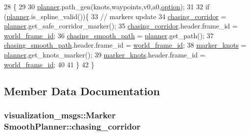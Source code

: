 \begin{DoxyCode}
28                                                                                      \{
29 
30     \hyperlink{class_smooth_planner_aa9df69d4f514c7338ab2d066d38dd1a2}{planner}.path\_gen(knots,waypoints,v0,a0,\hyperlink{class_smooth_planner_af0c954aea3c6b5b82a160ed4be93fb17}{option});
31     
32     \textcolor{keywordflow}{if} (\hyperlink{class_smooth_planner_aa9df69d4f514c7338ab2d066d38dd1a2}{planner}.is\_spline\_valid())\{
33         \textcolor{comment}{// markers update }
34         \hyperlink{class_smooth_planner_addf7aab458c1407f23e3544bd76ac82b}{chasing\_corridor} = \hyperlink{class_smooth_planner_aa9df69d4f514c7338ab2d066d38dd1a2}{planner}.get\_safe\_corridor\_marker();
35         \hyperlink{class_smooth_planner_addf7aab458c1407f23e3544bd76ac82b}{chasing\_corridor}.header.frame\_id = \hyperlink{class_smooth_planner_ade278c4209b962d8342a2ee30e718c8b}{world\_frame\_id};
36         \hyperlink{class_smooth_planner_a6a33038c6041ff972bea7765780b56d0}{chasing\_smooth\_path} = \hyperlink{class_smooth_planner_aa9df69d4f514c7338ab2d066d38dd1a2}{planner}.get\_path();
37         \hyperlink{class_smooth_planner_a6a33038c6041ff972bea7765780b56d0}{chasing\_smooth\_path}.header.frame\_id = \hyperlink{class_smooth_planner_ade278c4209b962d8342a2ee30e718c8b}{world\_frame\_id};        
38         \hyperlink{class_smooth_planner_afeeab9ce830d4960babdc84c82da94ea}{marker\_knots} = \hyperlink{class_smooth_planner_aa9df69d4f514c7338ab2d066d38dd1a2}{planner}.get\_knots\_marker();
39         \hyperlink{class_smooth_planner_afeeab9ce830d4960babdc84c82da94ea}{marker\_knots}.header.frame\_id = \hyperlink{class_smooth_planner_ade278c4209b962d8342a2ee30e718c8b}{world\_frame\_id};
40 
41     \}
42 \}
\end{DoxyCode}


\subsection{Member Data Documentation}
\subsubsection[{\texorpdfstring{chasing\+\_\+corridor}{chasing_corridor}}]{\setlength{\rightskip}{0pt plus 5cm}visualization\+\_\+msgs\+::\+Marker Smooth\+Planner\+::chasing\+\_\+corridor}\hypertarget{class_smooth_planner_addf7aab458c1407f23e3544bd76ac82b}{}\label{class_smooth_planner_addf7aab458c1407f23e3544bd76ac82b}
